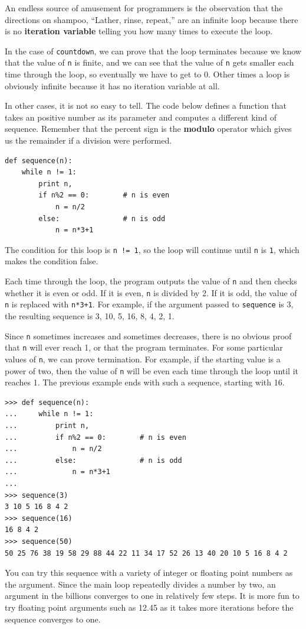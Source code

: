 \documentclass[10pt]{book}
\begin{document}
An endless source of amusement for 
programmers is the observation that the directions on shampoo,
``Lather, rinse, repeat,'' are an infinite loop because 
there is no {\bf iteration variable} telling you how many times
to execute the loop.


In the case of {\tt countdown}, we can prove that the loop
terminates because we know that the value of {\tt n} is finite, and we
can see that the value of {\tt n} gets smaller each time through the
loop, so eventually we have to get to 0.  Other times a loop is obviously
infinite because it has no iteration variable at all.

In other cases, it is not so easy to tell.  The code below defines a function
that takes an positive number as its parameter and computes a different 
kind of sequence.
Remember that the percent sign is the {\bf modulo} operator which gives us the
remainder if a division were performed.

\beforeverb
\begin{verbatim}
def sequence(n):
    while n != 1:
        print n,
        if n%2 == 0:        # n is even
            n = n/2
        else:               # n is odd
            n = n*3+1
\end{verbatim}
\afterverb
%
The condition for this loop is {\tt n != 1}, so the loop will continue
until {\tt n} is {\tt 1}, which makes the condition false.

Each time through the loop, the program outputs the value of {\tt n}
and then checks whether it is even or odd.  If it is even, {\tt n} is 
divided by 2.  If it is odd, the value of {\tt n} is replaced with
{\tt n*3+1}. For example, if the argument passed
to {\tt sequence} is 3, the resulting sequence is 3, 10, 5, 16, 8, 4, 2, 1.

Since {\tt n} sometimes increases and sometimes decreases, there is no
obvious proof that {\tt n} will ever reach 1, or that the program
terminates.  For some particular values of {\tt n}, we can prove
termination.  For example, if the starting value is a power of two,
then the value of {\tt n} will be even each time through the loop
until it reaches 1. The previous example ends with such a sequence,
starting with 16.

\beforeverb
\begin{verbatim}
>>> def sequence(n):
...     while n != 1:
...         print n,
...         if n%2 == 0:        # n is even
...             n = n/2
...         else:               # n is odd
...             n = n*3+1
... 
>>> sequence(3)
3 10 5 16 8 4 2
>>> sequence(16)
16 8 4 2
>>> sequence(50)
50 25 76 38 19 58 29 88 44 22 11 34 17 52 26 13 40 20 10 5 16 8 4 2
\end{verbatim}
\afterverb
%
You can try this sequence with a variety of integer or floating 
point numbers as the argument.  
Since the main loop repeatedly divides a number
by two, an argument in the billions converges to one in 
relatively few steps.  
It is more fun to try floating point arguments 
such as 12.45 as it takes more iterations before the sequence
converges to one.
\end{document}
